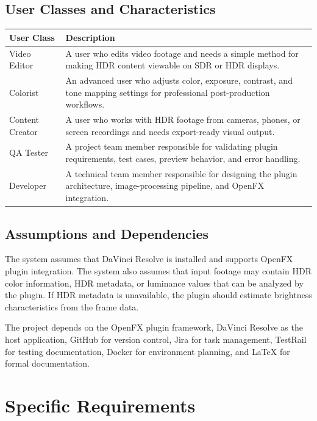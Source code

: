 \documentclass[12pt]{article}
\begin{document}
\subsection{User Classes and Characteristics}
\begin{table}[H]
\centering
\renewcommand{\arraystretch}{1.4}
\begin{tabular}{|p{4cm}|p{11cm}|}
\hline
\textbf{User Class} & \textbf{Description} \\
\hline
Video Editor & A user who edits video footage and needs a simple method for making HDR content viewable on SDR or HDR displays. \\
\hline
Colorist & An advanced user who adjusts color, exposure, contrast, and tone mapping settings for professional post-production workflows. \\
\hline
Content Creator & A user who works with HDR footage from cameras, phones, or screen recordings and needs export-ready visual output. \\
\hline
QA Tester & A project team member responsible for validating plugin requirements, test cases, preview behavior, and error handling. \\
\hline
Developer & A technical team member responsible for designing the plugin architecture, image-processing pipeline, and OpenFX integration. \\
\hline
\end{tabular}
\end{table}

\subsection{Assumptions and Dependencies}
The system assumes that DaVinci Resolve is installed and supports OpenFX plugin integration. The system also assumes that input footage may contain HDR color information, HDR metadata, or luminance values that can be analyzed by the plugin. If HDR metadata is unavailable, the plugin should estimate brightness characteristics from the frame data.

The project depends on the OpenFX plugin framework, DaVinci Resolve as the host application, GitHub for version control, Jira for task management, TestRail for testing documentation, Docker for environment planning, and LaTeX for formal documentation.


\section{Specific Requirements}
\end{document}

